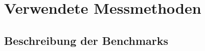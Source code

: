 \section{Verwendete Messmethoden}
\label{methoden}

\subsection{Beschreibung der Benchmarks}
\label{methoden:benchmarks}
